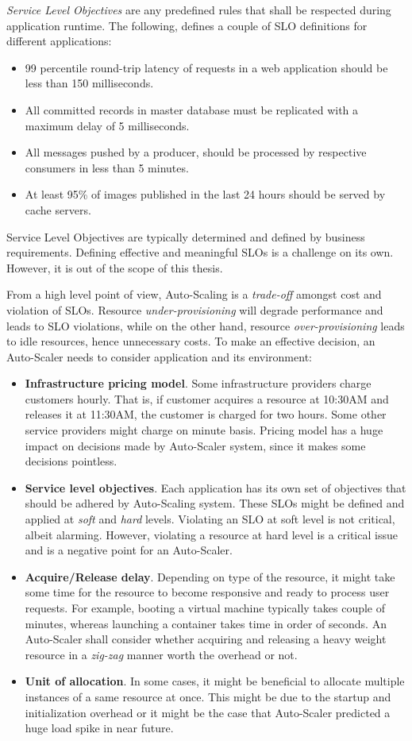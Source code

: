 \emph{Service Level Objectives} are any predefined rules that shall be respected during application runtime. The following, defines a couple of SLO definitions for different applications:
\begin{itemize}
    \item 99 percentile round-trip latency of requests in a web application should be less than 150 milliseconds.
    \item All committed records in master database must be replicated with a maximum delay of 5 milliseconds.
    \item All messages pushed by a producer, should be processed by respective consumers in less than 5 minutes.
    \item At least 95\% of images published in the last 24 hours should be served by cache servers.
\end{itemize}
Service Level Objectives are typically determined and defined by business requirements. Defining effective and meaningful SLOs is a challenge on its own. However, it is out of the scope of this thesis. 

From a high level point of view, Auto-Scaling is a \emph{trade-off} amongst cost and violation of SLOs. Resource \emph{under-provisioning} will degrade performance and leads to SLO violations, while on the other hand, resource \emph{over-provisioning} leads to idle resources, hence unnecessary costs. To make an effective decision, an Auto-Scaler needs to consider application and its environment:
\begin{itemize}
    \item \textbf{Infrastructure pricing model}. Some infrastructure providers charge customers hourly. That is, if customer acquires a resource at 10:30AM and releases it at 11:30AM, the customer is charged for two hours. Some other service providers might charge on minute basis. Pricing model has a huge impact on decisions made by Auto-Scaler system, since it makes some decisions pointless.
    \item \textbf{Service level objectives}. Each application has its own set of objectives that should be adhered by Auto-Scaling system. These SLOs might be defined and applied at \emph{soft} and \emph{hard} levels. Violating an SLO at soft level is not critical, albeit alarming. However, violating a resource at hard level is a critical issue and is a negative point for an Auto-Scaler.
    \item \textbf{Acquire/Release delay}. Depending on type of the resource, it might take some time for the resource to become responsive and ready to process user requests. For example, booting a virtual machine typically takes couple of minutes, whereas launching a container takes time in order of seconds. An Auto-Scaler shall consider whether acquiring and releasing a heavy weight resource in a \emph{zig-zag} manner worth the overhead or not.
    \item \textbf{Unit of allocation}. In some cases, it might be beneficial to allocate multiple instances of a same resource at once. This might be due to the startup and initialization overhead or it might be the case that Auto-Scaler predicted a huge load spike in near future.
\end{itemize}

